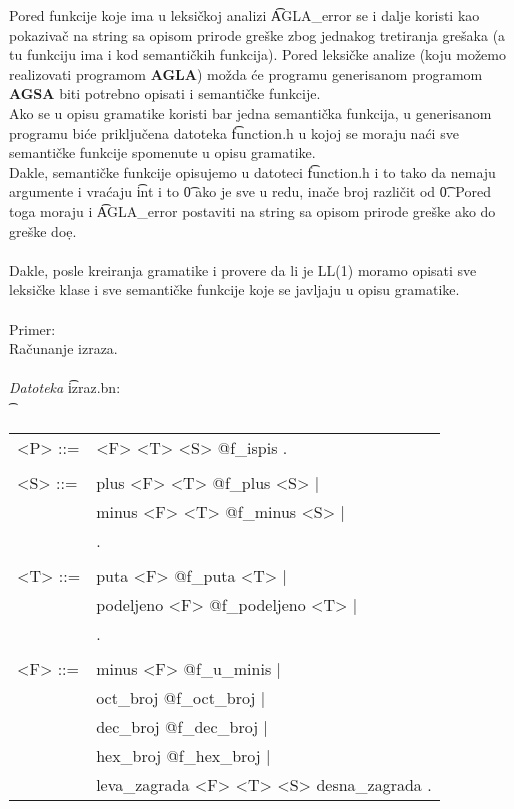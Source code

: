       Pored funkcije koje ima u leksi\v ckoj analizi \t{AGLA\_error} se i
      dalje koristi kao pokaziva\v c na string sa opisom prirode gre\v ske
      zbog jednakog tretiranja gre\v saka (a tu funkciju ima i kod
      semanti\v ckih funkcija).
%
%
      Pored leksi\v cke analize (koju mo\v zemo realizovati programom
      {\bf AGLA}) mo\v zda \'ce programu generisanom programom {\bf AGSA}
      biti potrebno opisati i semanti\v cke funkcije.\\
      Ako se u opisu gramatike koristi bar jedna semanti\v cka funkcija, u
      generisanom programu bi\'ce priklju\v cena datoteka \t{function.h} u
      kojoj se moraju na\'ci sve semanti\v cke funkcije spomenute u opisu
      gramatike.\\
      Dakle, semanti\v cke funkcije opisujemo u datoteci \t{function.h} i
      to tako da nemaju argumente i vra\'caju \t{int} i to \t{0} ako je sve
      u redu, ina\v ce broj razli\v cit od \t{0}.
      Pored toga moraju i \t{AGLA\_error} postaviti na string sa opisom
      prirode gre\v ske ako do gre\v ske do\d e.\\
      \\
      Dakle, posle kreiranja gramatike i provere da li je LL(1) moramo
      opisati sve leksi\v cke klase i sve semanti\v cke funkcije koje se
      javljaju u opisu gramatike.\\
      \\
      Primer:\\
      Ra\v cunanje izraza.\\
      \\
      {\sl Datoteka} \t{izraz.bn}:\\
      \t
      {
        \begin{tabular}{ll}
          <P> ::=&<F> <T> <S> @f\_ispis .\\
                 & \\
          <S> ::=&plus <F> <T> @f\_plus <S> |\\
                 &minus <F> <T> @f\_minus <S> |\\
                 &.\\
                 & \\
          <T> ::=&puta <F> @f\_puta <T> |\\
                 &podeljeno <F> @f\_podeljeno <T> |\\
                 &.\\
                 & \\
          <F> ::=&minus <F> @f\_u\_minis |\\
                 &oct\_broj @f\_oct\_broj |\\
                 &dec\_broj @f\_dec\_broj |\\
                 &hex\_broj @f\_hex\_broj |\\
                 &leva\_zagrada <F> <T> <S> desna\_zagrada .\\
        \end{tabular}\\
      }\\
